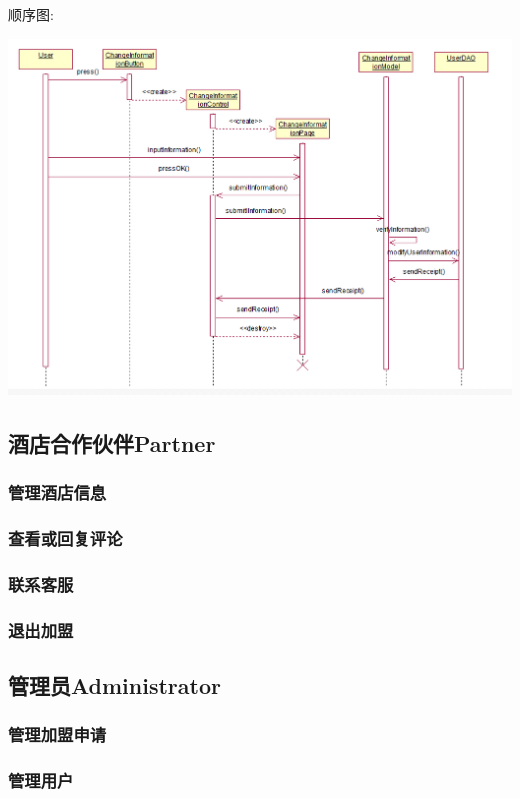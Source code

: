 \documentclass[11pt]{article}
\begin{document}
			顺序图: 
			\begin{center}
			\includegraphics[scale=0.42]{修改用户信息_顺序图.png}
			\end{center}
			
			
			
			
	\subsection{酒店合作伙伴Partner}
		\subsubsection{管理酒店信息}
		\subsubsection{查看或回复评论}
		\subsubsection{联系客服}
		\subsubsection{退出加盟}
		
	\subsection{管理员Administrator}
		\subsubsection{管理加盟申请}
		\subsubsection{管理用户}
		
\end{document}

